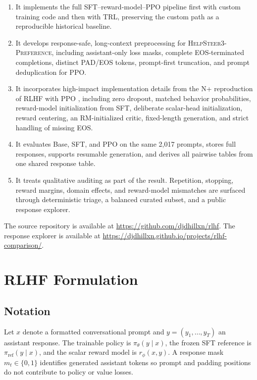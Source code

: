 \documentclass[11pt]{article}
\newcommand{\dataset}{\textsc{HelpSteer3-Preference}}
\newcommand{\trl}{\textsc{TRL}}
\newcommand{\projecturl}{\url{https://github.com/djdhillxn/rlhf}}
\newcommand{\explorerurl}{\url{https://djdhillxn.github.io/projects/rlhf-comparison/}}
\begin{document}
\begin{enumerate}
  \item It implements the full SFT--reward-model--PPO pipeline first with
  custom training code and then with \trl{}, preserving the custom path as a
  reproducible historical baseline.
  \item It develops response-safe, long-context preprocessing for
  \dataset{}, including assistant-only loss masks, complete EOS-terminated
  completions, distinct PAD/EOS tokens, prompt-first truncation, and prompt
  deduplication for PPO.
  \item It incorporates high-impact implementation details from the N+
  reproduction of RLHF with PPO \cite{huang2024}, including zero dropout,
  matched behavior probabilities, reward-model initialization from SFT,
  deliberate scalar-head initialization, reward centering, an
  RM-initialized critic, fixed-length generation, and strict handling of
  missing EOS.
  \item It evaluates Base, SFT, and PPO on the same 2,017 prompts, stores full
  responses, supports resumable generation, and derives all pairwise tables
  from one shared response table.
  \item It treats qualitative auditing as part of the result. Repetition,
  stopping, reward margins, domain effects, and reward-model mismatches are
  surfaced through deterministic triage, a balanced curated subset, and a
  public response explorer.
\end{enumerate}

The source repository is available at \projecturl{}. The response explorer is
available at \explorerurl{}.

\section{RLHF Formulation}

\subsection{Notation}

Let $x$ denote a formatted conversational prompt and
$y=(y_1,\ldots,y_T)$ an assistant response. The trainable policy is
$\pi_\theta(y\mid x)$, the frozen SFT reference is
$\pi_{\mathrm{ref}}(y\mid x)$, and the scalar reward model is
$r_\phi(x,y)$. A response mask $m_t\in\{0,1\}$ identifies generated assistant
tokens so prompt and padding positions do not contribute to policy or value
losses.
\end{document}
